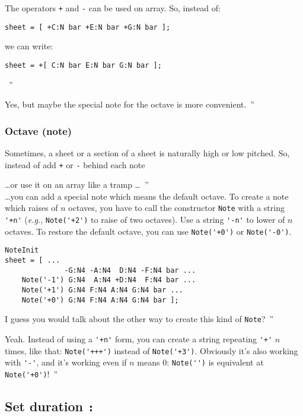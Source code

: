 \documentclass{article}
\newcommand{\note}{\lstinline!Note!\xspace}
\newcommand{\eg}{\emph{e.g.}\xspace}
\newenvironment{meenv}{ \par \noindent \makebox[6em][r]{ \textcolor{mecolor}{Me}: `` --~}}{~''}
\newenvironment{myselfenv}{ \par \noindent \makebox[6em][r]{ \textcolor{myselfcolor}{Myself}: `` --~}}{~''}
\newcommand{\me}[1]{\begin{meenv}#1\end{meenv}}
\newcommand{\myself}[1]{\begin{myselfenv}#1\end{myselfenv}}
\begin{document}
\begin{meenv}%
The operators \lstinline!+! and \lstinline!-! can be used on array. So, instead of:
\begin{lstlisting}
sheet = [ +C:N bar +E:N bar +G:N bar ];
\end{lstlisting}
we can write:
\begin{lstlisting}
sheet = +[ C:N bar E:N bar G:N bar ];
\end{lstlisting}%
\end{meenv}
\myself{Yes, but maybe the special note for the octave is more convenient.}

\subsubsection{Octave (note)}
\label{sec:OctaveNote}

Sometimes, a sheet or a section of a sheet is naturally high or low pitched. So, instead of add \lstinline!+! or \lstinline!-! behind each note
\myself{\dots or use it on an array like a tramp \dots} \\
\dots you can add a special note which means the default octave. To create a note which raises of $n$ octaves, you have to call the constructor \note with a string \lstinline!'+n'! (\eg, \lstinline!Note('+2')! to raise of two octaves). Use a string \lstinline!'-n'! to lower of $n$ octaves. To restore the default octave, you can use \lstinline!Note('+0')! or \lstinline!Note('-0')!. \\

\begin{lstlisting}
NoteInit
sheet = [ ...
	          -G:N4 -A:N4  D:N4 -F:N4 bar ...
	Note('-1') G:N4  A:N4 +D:N4  F:N4 bar ...
	Note('+1') G:N4 F:N4 A:N4 G:N4 bar ...
	Note('+0') G:N4 F:N4 A:N4 G:N4 bar ];
\end{lstlisting}

\myself{I guess you would talk about the other way to create this kind of \note?}
\me{Yeah. Instead of using a \lstinline!'+n'! form, you can create a string repeating \lstinline!'+'! $n$ times, like that: \lstinline!Note('+++')! instead of \lstinline!Note('+3')!. Obviously it's also working with \lstinline!'-'!, and it's working even if $n$ means $0$: \lstinline!Note('')! is equivalent at \lstinline!Note('+0')!!}

\subsection{Set duration \lstinline!:!}
\label{sec:SetDuration}
\end{document}
